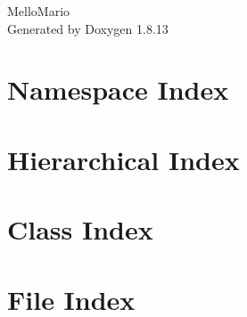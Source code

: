 \documentclass[twoside]{book}
\newcommand{\+}{\discretionary{\mbox{\scriptsize$\hookleftarrow$}}{}{}}
\newcommand{\clearemptydoublepage}{%
  \newpage{\pagestyle{empty}\cleardoublepage}%
}
\begin{document}
\begin{titlepage}
\vspace*{7cm}
\begin{center}%
{\Large Mello\+Mario }\\
\vspace*{1cm}
{\large Generated by Doxygen 1.8.13}\\
\end{center}
\end{titlepage}
\clearemptydoublepage
{}
\tableofcontents
\clearemptydoublepage
{}

\chapter{Namespace Index}

\chapter{Hierarchical Index}

\chapter{Class Index}

\chapter{File Index}

\end{document}
